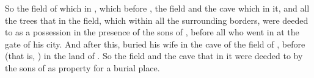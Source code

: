 \bverse So the field of  which \was in , which \was before , the field and the cave which \was in it, and all the trees that \were in the field, which \were within all the surrounding borders, were deeded 
\bverse to \Abraham as a possession in the presence of the sons of , before all who went in at the gate of his city.
\bverse And after this, \Abraham buried \Sarah his wife in the cave of the field of , before  (that is, ) in the land of \Canaan.
\bverse So the field and the cave that \is in it were deeded to \Abraham by the sons of  as property for a burial place.
